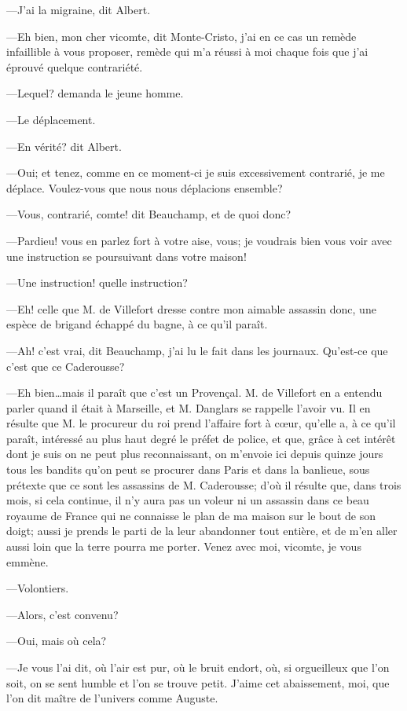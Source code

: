 —J'ai la migraine, dit Albert. 

—Eh bien, mon cher vicomte, dit Monte-Cristo, j'ai en ce cas un remède infaillible à vous proposer, remède qui m'a réussi à moi chaque fois que j'ai éprouvé quelque contrariété. 

—Lequel? demanda le jeune homme. 

—Le déplacement. 

—En vérité? dit Albert. 

—Oui; et tenez, comme en ce moment-ci je suis excessivement contrarié, je me déplace. Voulez-vous que nous nous déplacions ensemble? 

—Vous, contrarié, comte! dit Beauchamp, et de quoi donc? 

—Pardieu! vous en parlez fort à votre aise, vous; je voudrais bien vous voir avec une instruction se poursuivant dans votre maison! 

—Une instruction! quelle instruction? 

—Eh! celle que M. de Villefort dresse contre mon aimable assassin donc, une espèce de brigand échappé du bagne, à ce qu'il paraît. 

—Ah! c'est vrai, dit Beauchamp, j'ai lu le fait dans les journaux. Qu'est-ce que c'est que ce Caderousse? 

—Eh bien\dots mais il paraît que c'est un Provençal. M. de Villefort en a entendu parler quand il était à Marseille, et M. Danglars se rappelle l'avoir vu. Il en résulte que M. le procureur du roi prend l'affaire fort à cœur, qu'elle a, à ce qu'il paraît, intéressé au plus haut degré le préfet de police, et que, grâce à cet intérêt dont je suis on ne peut plus reconnaissant, on m'envoie ici depuis quinze jours tous les bandits qu'on peut se procurer dans Paris et dans la banlieue, sous prétexte que ce sont les assassins de M. Caderousse; d'où il résulte que, dans trois mois, si cela continue, il n'y aura pas un voleur ni un assassin dans ce beau royaume de France qui ne connaisse le plan de ma maison sur le bout de son doigt; aussi je prends le parti de la leur abandonner tout entière, et de m'en aller aussi loin que la terre pourra me porter. Venez avec moi, vicomte, je vous emmène. 

—Volontiers. 

—Alors, c'est convenu? 

—Oui, mais où cela? 

—Je vous l'ai dit, où l'air est pur, où le bruit endort, où, si orgueilleux que l'on soit, on se sent humble et l'on se trouve petit. J'aime cet abaissement, moi, que l'on dit maître de l'univers comme Auguste. 

